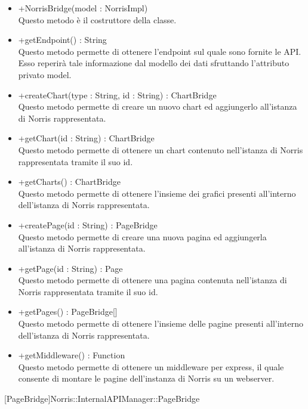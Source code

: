 \begin{itemize}
\begin{itemize}
					\item[\ding{111}] {{+NorrisBridge(model : NorrisImpl)}} \\ [1mm] Questo metodo è il costruttore della classe.
					\item[\ding{111}] {{+getEndpoint() : String}} \\ [1mm] Questo metodo permette di ottenere l'endpoint sul quale sono fornite le API. Esso reperirà tale informazione dal modello dei dati sfruttando l'attributo privato model.
					\item[\ding{111}] {{+createChart(type : String, id : String) : ChartBridge}} \\ [1mm] Questo metodo permette di creare un nuovo chart ed aggiungerlo all'istanza di Norris rappresentata.
					\item[\ding{111}] {{+getChart(id : String) : ChartBridge}} \\ [1mm] Questo metodo permette di ottenere un chart contenuto nell'istanza di Norris rappresentata tramite il suo id.
					\item[\ding{111}] {{+getCharts() : ChartBridge}} \\ [1mm] Questo metodo permette di ottenere l'insieme dei grafici presenti all'interno dell'istanza di Norris rappresentata.
					\item[\ding{111}] {{+createPage(id : String) : PageBridge}} \\ [1mm] Questo metodo permette di creare una nuova pagina ed aggiungerla all'istanza di Norris rappresentata.
					\item[\ding{111}] {{+getPage(id : String) : Page}} \\ [1mm] Questo metodo permette di ottenere una pagina contenuta nell'istanza di Norris rappresentata tramite il suo id.
					\item[\ding{111}] {{+getPages() : PageBridge[]}} \\ [1mm] Questo metodo permette di ottenere l'insieme delle pagine presenti all'interno dell'istanza di Norris rappresentata.
					\item[\ding{111}] {{+getMiddleware() : Function}} \\ [1mm] Questo metodo permette di ottenere un middleware per express, il quale consente di montare le pagine dell'instanza di Norris su un webserver.
				\end{itemize}
		
			\end{itemize}

			
			[PageBridge]{Norris::InternalAPIManager::PageBridge}
			

